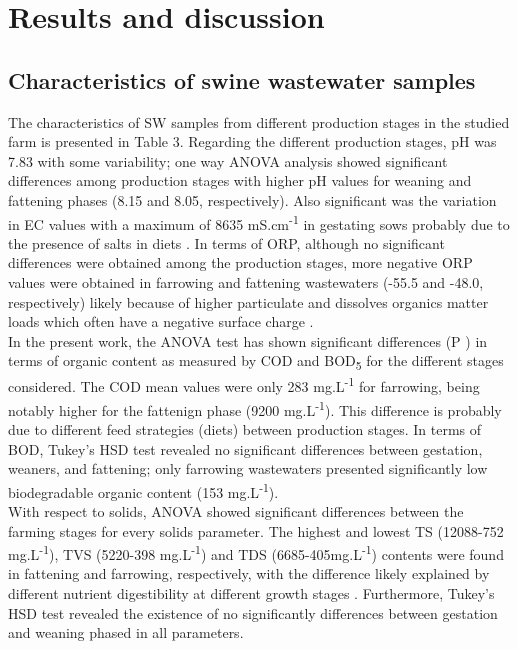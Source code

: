 \section{Results and discussion}
\subsection{Characteristics of swine wastewater samples}
The characteristics of SW samples from different production stages in the studied farm is presented in Table 3. Regarding the different production stages, pH was 7.83 with some variability; one way ANOVA analysis showed significant differences among production stages with higher pH values for weaning and fattening phases (8.15 and 8.05, respectively). Also significant was the variation in EC values with a maximum of 8635 mS.cm\textsuperscript{-1} in gestating sows probably due to the presence of salts in diets \cite{Mart_nez_Suller_2008,Moral_2005,Moral_2008}. In terms of ORP, although no significant differences were obtained among the production stages, more negative ORP values were obtained in farrowing and fattening wastewaters (-55.5 and -48.0, respectively) likely because of higher particulate and dissolves organics matter loads which often have a negative surface charge \cite{Hjorth_2011}.\\
In the present work, the ANOVA test has shown significant differences (P ) in terms of organic content as measured by COD and BOD\textsubscript{5} for the different stages considered. The COD mean values were only 283 mg.L\textsuperscript{-1} for farrowing, being notably higher for the fattenign phase (9200 mg.L\textsuperscript{-1}). This difference is probably due to different feed strategies (diets) between production stages. In terms of BOD, Tukey’s HSD test revealed no significant differences between gestation, weaners, and fattening; only farrowing wastewaters presented significantly low biodegradable organic content (153 mg.L\textsuperscript{-1}).\\
With respect to solids, ANOVA showed significant differences between the farming stages for every solids parameter. The highest and lowest TS (12088-752 mg.L\textsuperscript{-1}), TVS (5220-398 mg.L\textsuperscript{-1}) and TDS (6685-405mg.L\textsuperscript{-1}) contents were found in fattening and farrowing, respectively, with the difference likely explained by different nutrient digestibility at different growth stages \cite{Zhang_2014}. Furthermore, Tukey’s HSD test revealed the existence of no significantly differences between gestation and weaning phased in all parameters.\\

